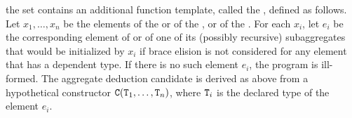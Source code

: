 the set contains an additional function template,
called the , defined as follows.
Let $x_1, \dotsc, x_n$ be the elements
of the  or
of the , or
of the .
For each $x_i$, let $e_i$ be the corresponding element
of  or of one of its (possibly recursive) subaggregates
that would be initialized by $x_i$
if brace elision is not considered for any element
that has a dependent type.
If there is no such element $e_i$, the program is ill-formed.
The aggregate deduction candidate is derived as above
from a hypothetical constructor $\texttt{C}(\texttt{T}_1, \dotsc, \texttt{T}_n)$,
where $\texttt{T}_i$ is the declared type of the element $e_i$.

